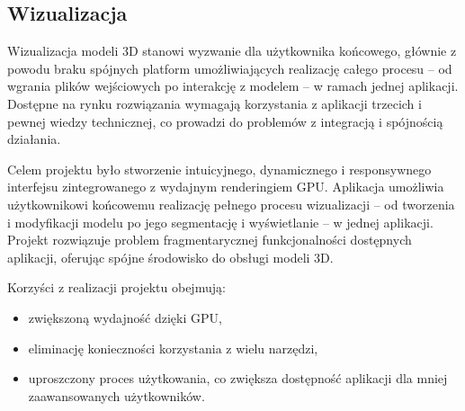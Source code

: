\subsection{Wizualizacja}
Wizualizacja modeli 3D stanowi wyzwanie dla użytkownika końcowego,
głównie z powodu braku spójnych platform umożliwiających realizację
całego procesu – od wgrania plików wejściowych po interakcję z modelem – w ramach jednej aplikacji.
Dostępne na rynku rozwiązania wymagają korzystania z aplikacji trzecich i pewnej wiedzy technicznej,
co prowadzi do problemów z integracją i spójnością działania.

Celem projektu było stworzenie intuicyjnego, dynamicznego i responsywnego interfejsu zintegrowanego z wydajnym renderingiem GPU.
Aplikacja umożliwia użytkownikowi końcowemu realizację pełnego procesu
wizualizacji – od tworzenia i modyfikacji modelu po jego segmentację i wyświetlanie – w jednej aplikacji.
Projekt rozwiązuje problem fragmentarycznej funkcjonalności dostępnych aplikacji, oferując spójne środowisko do obsługi modeli 3D.

Korzyści z realizacji projektu obejmują:

\begin{itemize}
    \item zwiększoną wydajność dzięki GPU,
    \item eliminację konieczności korzystania z wielu narzędzi,
    \item uproszczony proces użytkowania, co zwiększa dostępność aplikacji dla mniej zaawansowanych użytkowników.
\end{itemize}